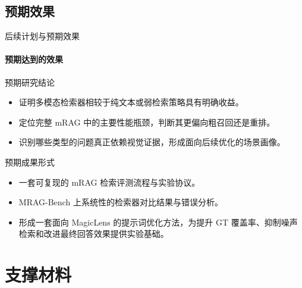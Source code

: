 \documentclass[10pt,aspectratio=169,]{beamer}
\begin{document}
\subsection{预期效果}
\begin{frame}{后续计划与预期效果}
	\framesubtitle{预期达到的效果}
	\begin{block}{预期研究结论}
		\begin{itemize}
			\item 证明多模态检索器相较于纯文本或弱检索策略具有明确收益。
			\item 定位完整 mRAG 中的主要性能瓶颈，判断其更偏向粗召回还是重排。
			\item 识别哪些类型的问题真正依赖视觉证据，形成面向后续优化的场景画像。
		\end{itemize}
	\end{block}
	\begin{alertblock}{预期成果形式}
		\begin{itemize}
			\item 一套可复现的 mRAG 检索评测流程与实验协议。
			\item MRAG-Bench 上系统性的检索器对比结果与错误分析。
			\item 形成一套面向 MagicLens 的提示词优化方法，为提升 GT 覆盖率、抑制噪声检索和改进最终回答效果提供实验基础。
		\end{itemize}
	\end{alertblock}
\end{frame}

\section{支撑材料}
\end{document}
